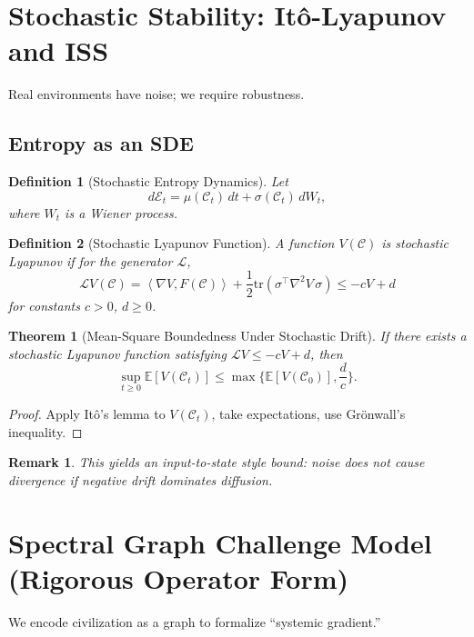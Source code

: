 \documentclass[11pt]{article}
\newtheorem{definition}{Definition}
\newtheorem{theorem}{Theorem}
\newtheorem{remark}{Remark}
\newcommand{\Eenv}{\mathcal{E}}     %
\newcommand{\Civ}{\mathcal{C}}      %
\newcommand{\ip}[2]{\left\langle #1,#2\right\rangle}
\begin{document}
\section{Stochastic Stability: It\^o-Lyapunov and ISS}

Real environments have noise; we require robustness.

\subsection{Entropy as an SDE}

\begin{definition}[Stochastic Entropy Dynamics]
Let
\[
d\Eenv_t = \mu(\Civ_t)\,dt + \sigma(\Civ_t)\,dW_t,
\]
where $W_t$ is a Wiener process.
\end{definition}

\begin{definition}[Stochastic Lyapunov Function]
A function $V(\Civ)$ is stochastic Lyapunov if for the generator $\mathcal{L}$,
\[
\mathcal{L}V(\Civ)=\ip{\nabla V}{F(\Civ)} + \frac{1}{2}\mathrm{tr}\!\left(\sigma^\top \nabla^2 V\,\sigma\right)\le -cV + d
\]
for constants $c>0$, $d\ge 0$.
\end{definition}

\begin{theorem}[Mean-Square Boundedness Under Stochastic Drift]
If there exists a stochastic Lyapunov function satisfying $\mathcal{L}V\le -cV+d$, then
\[
\sup_{t\ge 0}\mathbb{E}[V(\Civ_t)] \le \max\Big\{ \mathbb{E}[V(\Civ_0)], \frac{d}{c}\Big\}.
\]
\end{theorem}

\begin{proof}
Apply It\^o's lemma to $V(\Civ_t)$, take expectations, use Gr\"onwall's inequality.
\end{proof}

\begin{remark}
This yields an input-to-state style bound: noise does not cause divergence if negative drift dominates diffusion.
\end{remark}

\section{Spectral Graph Challenge Model (Rigorous Operator Form)}

We encode civilization as a graph to formalize ``systemic gradient.''
\end{document}

